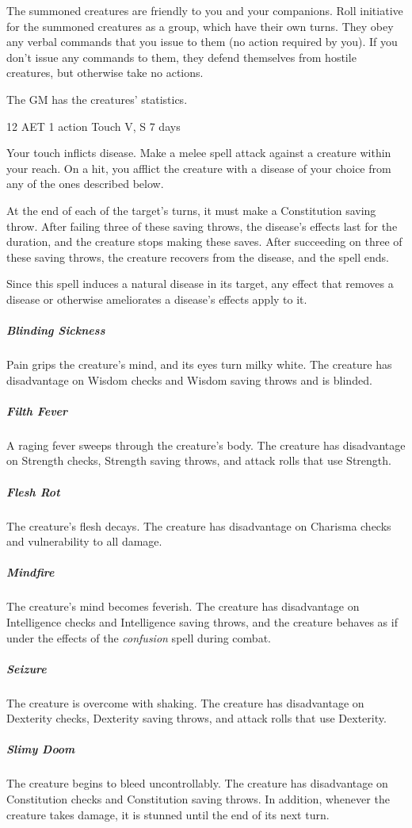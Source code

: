 The summoned creatures are friendly to you and your companions. Roll initiative for the summoned creatures as a group, which have their own turns. They obey any verbal commands that you issue to them (no action required by you). If you don't issue any commands to them, they defend themselves from hostile creatures, but otherwise take no actions.

The GM has the creatures' statistics.


{12 AET}
{1 action}
{Touch}
{V, S}
{7 days}

Your touch inflicts disease. Make a melee spell attack against a creature within your reach. On a hit, you afflict the creature with a disease of your choice from any of the ones described below.

At the end of each of the target's turns, it must make a Constitution saving throw. After failing three of these saving throws, the disease's effects last for the duration, and the creature stops making these saves. After succeeding on three of these saving throws, the creature recovers from the disease, and the spell ends.

Since this spell induces a natural disease in its target, any effect that removes a disease or otherwise ameliorates a disease's effects apply to it.

\subparagraph*{Blinding Sickness} Pain grips the creature's mind, and its eyes turn milky white. The creature has disadvantage on Wisdom checks and Wisdom saving throws and is blinded.

\subparagraph*{Filth Fever} A raging fever sweeps through the creature's body. The creature has disadvantage on Strength checks, Strength saving throws, and attack rolls that use Strength.

\subparagraph*{Flesh Rot} The creature's flesh decays. The creature has disadvantage on Charisma checks and vulnerability to all damage.

\subparagraph*{Mindfire} The creature's mind becomes feverish. The creature has disadvantage on Intelligence checks and Intelligence saving throws, and the creature behaves as if under the effects of the \textit{confusion} spell during combat.

\subparagraph*{Seizure} The creature is overcome with shaking. The creature has disadvantage on Dexterity checks, Dexterity saving throws, and attack rolls that use Dexterity.

\subparagraph*{Slimy Doom} The creature begins to bleed uncontrollably. The creature has disadvantage on Constitution checks and Constitution saving throws. In addition, whenever the creature takes damage, it is stunned until the end of its next turn.


